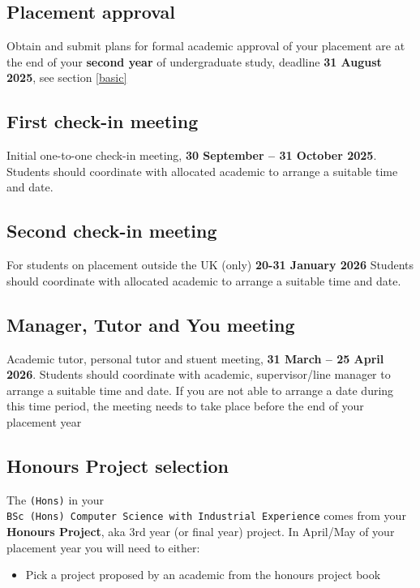 \documentclass[
]{book}
\providecommand{\tightlist}{%
  \setlength{\itemsep}{0pt}\setlength{\parskip}{0pt}}
\begin{document}
\subsection{Placement approval}\label{approval}

Obtain and submit plans for formal academic approval of your placement are at the end of your \textbf{second year} of undergraduate study, deadline \textbf{31 August 2025}, see section \ref{basic}

\subsection{First check-in meeting}\label{one}

Initial one-to-one check-in meeting, \textbf{30 September -- 31 October 2025}. Students should coordinate with allocated academic to arrange a suitable time and date.

\subsection{Second check-in meeting}\label{two}

For students on placement outside the UK (only) \textbf{20-31 January 2026} Students should coordinate with allocated academic to arrange a suitable time and date.

\subsection{Manager, Tutor and You meeting}\label{three}

Academic tutor, personal tutor and stuent meeting, \textbf{31 March -- 25 April 2026}. Students should coordinate with academic, supervisor/line manager to arrange a suitable time and date. If you are not able to arrange a date during this time period, the meeting needs to take place before the end of your placement year

\subsection{Honours Project selection}\label{four}

The \texttt{(Hons)} in your \texttt{BSc\ (Hons)\ Computer\ Science\ with\ Industrial\ Experience} comes from your \textbf{Honours Project}, aka 3rd year (or final year) project. In April/May of your placement year you will need to either:

\begin{itemize}
\tightlist
\item
  Pick a project proposed by an academic from the honours project book
\end{itemize}
\end{document}
